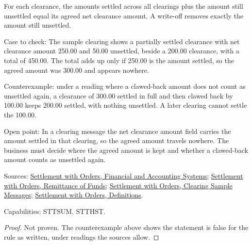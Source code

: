 \begin{theorem}
  \label{thm:accounting-settled-plus-remaining}
  For each clearance, the amounts settled across all clearings plus the
  amount still unsettled equal its agreed net clearance amount. A write-off
  removes exactly the amount still unsettled.

  Case to check: The sample clearing shows a partially settled clearance
  with net clearance amount 250.00 and 50.00 unsettled, beside a 200.00
  clearance, with a total of 450.00. The total adds up only if 250.00 is the
  amount settled, so the agreed amount was 300.00 and appears nowhere.

  Counterexample: under a reading where a clawed-back amount does not
  count as unsettled again, a clearance of 300.00 settled in full and then
  clawed back by 100.00 keeps 200.00 settled, with nothing unsettled.
  A later clearing cannot settle the 100.00.

  Open point: In a clearing message the net clearance amount field carries
  the amount settled in that clearing, so the agreed amount travels nowhere.
  The business must decide where the agreed amount is kept and whether a
  clawed-back amount counts as unsettled again.

  Sources: \href{https://standards.atlassian.net/wiki/spaces/SWO/pages/574554300}{Settlement with Orders, Financial and Accounting Systems};
  \href{https://standards.atlassian.net/wiki/spaces/SWO/pages/574718145}{Settlement with Orders, Remittance of Funds};
  \href{https://standards.atlassian.net/wiki/spaces/SWO/pages/574881978}{Settlement with Orders, Clearing Sample Messages};
  \href{https://standards.atlassian.net/wiki/spaces/SWO/pages/574915056}{Settlement with Orders, Definitions}.

  Capabilities: STTSUM, STTHST.
\end{theorem}
\begin{proof}
  Not proven.  The counterexample above shows the statement is false for
  the rule as written, under readings the sources allow.
\end{proof}

